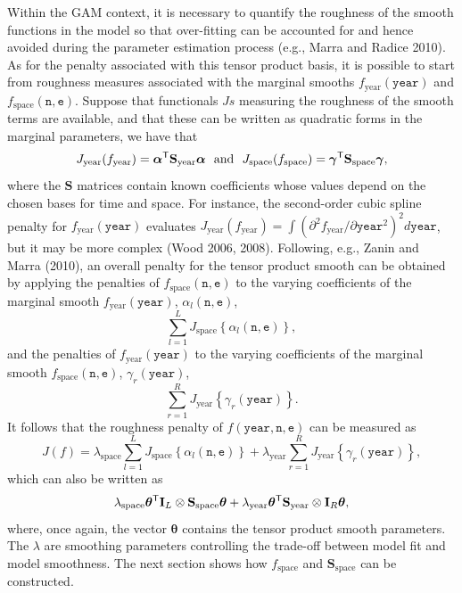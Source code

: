\documentclass[10pt] {article}
\newcommand{\ts}{^{\sf T}}
\theoremstyle{definition}
\theoremstyle{plain}
\begin{document}
Within the GAM context, it is necessary to quantify the roughness of the smooth functions in the model so that over-fitting can be accounted for and hence avoided during the parameter estimation process (e.g., Marra and Radice 2010). As for the penalty associated with this tensor product basis, it is possible to start from roughness measures associated with the marginal smooths $f_\text{year}(\texttt{year})$ and $f_\text{space}(\texttt{n},\texttt{e})$. Suppose that functionals $Js$ measuring the roughness of the smooth terms are available, and that these can be written as quadratic forms in the marginal parameters, we have that
$$
J_\text{year}(f_\text{year})=\bm\alpha\ts\textbf{S}_\text{year}\bm\alpha \ \ \text{and} \ \ J_\text{space}(f_\text{space})=\bm\gamma\ts\textbf{S}_\text{space}\bm\gamma,
$$
where the $\textbf{S}$ matrices contain known coefficients whose values depend on the chosen bases for time and space. For instance, the second-order cubic spline penalty for $f_\text{year}(\texttt{year})$ evaluates $J_\text{year}(f_\text{year})=\int\left( \partial^2 f_\text{year}/\partial \texttt{year}^2 \right)^2 d\texttt{year}$, but it may be more complex (Wood 2006, 2008). Following, e.g., Zanin and Marra (2010), an overall penalty for the tensor product smooth can be obtained by applying the penalties of $f_\text{space}(\texttt{n},\texttt{e})$ to the varying coefficients of the marginal smooth $f_\text{year}(\texttt{year})$, $\alpha_l(\texttt{n},\texttt{e})$,
$$
\sum_{l=1}^L J_\text{space}\left\{  \alpha_l(\texttt{n},\texttt{e}) \right\},
$$ 
and the penalties of $f_\text{year}(\texttt{year})$ to the varying coefficients of the marginal smooth $f_\text{space}(\texttt{n},\texttt{e})$, $\gamma_r(\texttt{year})$,  
$$
\sum_{r=1}^R J_\text{year}\left\{  \gamma_r(\texttt{year}) \right\}.
$$ 
It follows that the roughness penalty of $f(\texttt{year},\texttt{n},\texttt{e})$ can be measured as 
$$
J(f)=\lambda_\text{space} \sum_{l=1}^L J_\text{space}\left\{  \alpha_l(\texttt{n},\texttt{e}) \right\} + \lambda_\text{year} \sum_{r=1}^R J_\text{year}\left\{  \gamma_r(\texttt{year}) \right\},
$$
which can also be written as
$$
\lambda_\text{space} \bm\theta\ts \textbf{I}_L \otimes \textbf{S}_\text{space} \bm\theta + \lambda_\text{year} \bm\theta\ts \textbf{S}_\text{year} \otimes \textbf{I}_R  \bm\theta,
$$
where, once again, the vector $\bm\theta$ contains the tensor product smooth parameters. The $\lambda$ are smoothing parameters controlling the trade-off between model fit and model smoothness. The next section shows how $f_\text{space}$ and $\textbf{S}_\text{space}$ can be constructed.   
\end{document}
